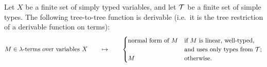\begin{theorem}\label{thm:normalise} Let $X$ be a finite set of simply typed variables, and let $\mathcal T$ be a finite set of simple types.
    The following tree-to-tree function is derivable (i.e.~it is the tree restriction of a derivable function on terms):
    \begin{align*}
        M \in \text{$\lambda$-terms over variables $X$} \qquad \mapsto \qquad \begin{cases}
            \text{normal form of $M$} & \text{if $M$ is linear, well-typed,}\\
            & \text{and uses only types from $\mathcal T$;}\\
            M & \text{otherwise}.
        \end{cases}
    \end{align*}
\end{theorem}





